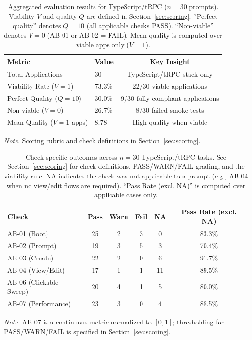 \documentclass[11pt]{article}
\begin{document}
\begin{table}[t]
\caption{Aggregated evaluation results for TypeScript/tRPC ($n=30$ prompts). Viability $V$ and quality $Q$ are defined in Section~\ref{sec:scoring}. ``Perfect quality'' denotes $Q=10$ (all applicable checks PASS). ``Non-viable'' denotes $V=0$ (AB-01 or AB-02 = FAIL). Mean quality is computed over viable apps only ($V=1$).}
\label{tab:aggregated-results}
\centering
\begin{threeparttable}
\begin{tabular}{llc}
\toprule
Metric & Value & Key Insight \\
\midrule
Total Applications & 30 & TypeScript/tRPC stack only \\
Viability Rate ($V=1$) & 73.3\% & 22/30 viable applications \\
Perfect Quality ($Q=10$) & 30.0\% & 9/30 fully compliant applications \\
Non-viable ($V=0$) & 26.7\% & 8/30 failed smoke tests \\
Mean Quality ($V=1$ apps) & 8.78 & High quality when viable \\
\bottomrule
\end{tabular}
\begin{tablenotes}
\item \textit{Note.} Scoring rubric and check definitions in Section~\ref{sec:scoring}.
\end{tablenotes}
\end{threeparttable}
\end{table}

\begin{table}[t]
\caption{Check-specific outcomes across $n=30$ TypeScript/tRPC tasks. See Section~\ref{sec:scoring} for check definitions, PASS/WARN/FAIL grading, and the viability rule. NA indicates the check was not applicable to a prompt (e.g., AB-04 when no view/edit flows are required). ``Pass Rate (excl. NA)'' is computed over applicable cases only.}
\label{tab:check-pass-rates}
\centering
\begin{threeparttable}
\begin{tabular}{lccccc}
\toprule
Check & Pass & Warn & Fail & NA & Pass Rate (excl. NA) \\
\midrule
AB-01 (Boot) & 25 & 2 & 3 & 0 & 83.3\% \\
AB-02 (Prompt) & 19 & 3 & 5 & 3 & 70.4\% \\
AB-03 (Create) & 22 & 2 & 0 & 6 & 91.7\% \\
AB-04 (View/Edit) & 17 & 1 & 1 & 11 & 89.5\% \\
AB-06 (Clickable Sweep) & 20 & 4 & 1 & 5 & 80.0\% \\
AB-07 (Performance) & 23 & 3 & 0 & 4 & 88.5\% \\
\bottomrule
\end{tabular}
\begin{tablenotes}
\item \textit{Note.} AB-07 is a continuous metric normalized to $[0,1]$; thresholding for PASS/WARN/FAIL is specified in Section~\ref{sec:scoring}.
\end{tablenotes}
\end{threeparttable}
\end{table}
\end{document}
